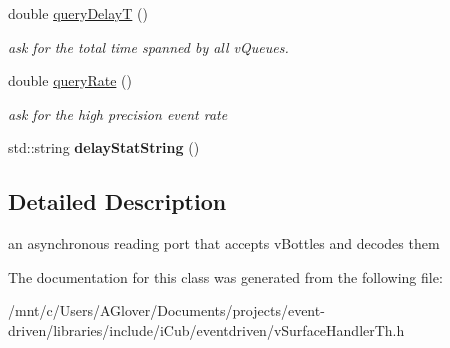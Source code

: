 \begin{DoxyCompactItemize}
\mbox{\label{classev_1_1queueAllocator_a439a2729d5474986977e26e63a9edf03}} 
double \hyperlink{classev_1_1queueAllocator_a439a2729d5474986977e26e63a9edf03}{query\+DelayT} ()
\begin{DoxyCompactList}\small\item\em ask for the total time spanned by all v\+Queues. \end{DoxyCompactList}\item 
\mbox{\label{classev_1_1queueAllocator_a39005a8e9337279debe435ae26c7d6fd}} 
double \hyperlink{classev_1_1queueAllocator_a39005a8e9337279debe435ae26c7d6fd}{query\+Rate} ()
\begin{DoxyCompactList}\small\item\em ask for the high precision event rate \end{DoxyCompactList}\item 
\mbox{\label{classev_1_1queueAllocator_a10282570a776a59efd302bb336109748}} 
std\+::string {\bfseries delay\+Stat\+String} ()
\end{DoxyCompactItemize}


\subsection{Detailed Description}
an asynchronous reading port that accepts v\+Bottles and decodes them 

The documentation for this class was generated from the following file\+:\begin{DoxyCompactItemize}
\item 
/mnt/c/\+Users/\+A\+Glover/\+Documents/projects/event-\/driven/libraries/include/i\+Cub/eventdriven/v\+Surface\+Handler\+Th.\+h\end{DoxyCompactItemize}
